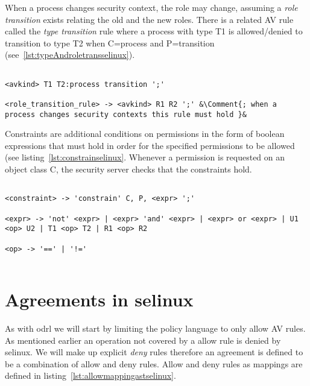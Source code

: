 When a process changes security context, the role may change, assuming a \emph{role transition} exists relating the old and the new roles. There is a related AV rule called the \emph{type transition} rule where a process with type T1 is allowed/denied to transition to type T2 when C=process and P=transition (see~\ref{lst:typeAndroletransselinux}).

\lstset{mathescape, language=AST} 
\begin{lstlisting}[frame=single, caption={Type Transition and Role-Allow Rules},label={lst:typeAndroletransselinux}]

<avkind> T1 T2:process transition ';'

<role_transition_rule> -> <avkind> R1 R2 ';' &\Comment{; when a process changes security contexts this rule must hold }&

\end{lstlisting}

Constraints are additional conditions on permissions in the form of boolean expressions that must hold in order for the specified permissions to be allowed (see listing~\ref{lst:constrainselinux}. Whenever a permission is requested on an object class C, the security server checks that the constraints hold.

\lstset{language=selinux}
\begin{minipage}[c]{0.95\textwidth}
\begin{lstlisting}[frame=single, caption={Constrain Rule},label={lst:constrainselinux}]

<constraint> -> 'constrain' C, P, <expr> ';'

<expr> -> 'not' <expr> | <expr> 'and' <expr> | <expr> or <expr> | U1 <op> U2 | T1 <op> T2 | R1 <op> R2

<op> -> '==' | '!='
 
\end{lstlisting}
\end{minipage}

\section{Agreements in \ac{selinux}}

As with \ac{odrl} we will start by limiting the policy language to only allow AV rules. As mentioned earlier an operation not covered by a allow rule is denied by \ac{selinux}. We will make up explicit \emph{deny} rules therefore an agreement is defined to be a combination of allow and deny rules. Allow and deny rules as mappings are defined in listing~\ref{lst:allowmappingastselinux}.

